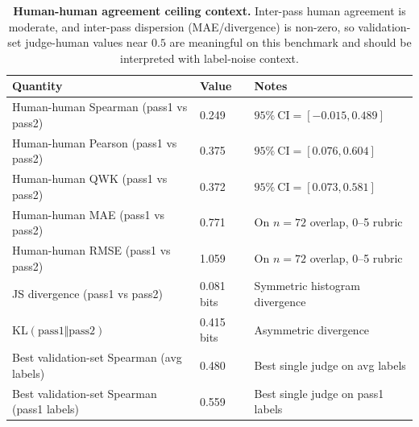\documentclass{article}
\begin{document}
\begin{table}[t]
  \centering
  \small
  \begin{tabular}{@{}p{}p{}p{}@{}}
    \toprule
    \textbf{Quantity}                           & \textbf{Value} & \textbf{Notes}                      \\
    \midrule
    Human-human Spearman (pass1 vs pass2)       & 0.249          & \(95\%\ \text{CI}=[-0.015, 0.489]\) \\
    Human-human Pearson (pass1 vs pass2)        & 0.375          & \(95\%\ \text{CI}=[0.076, 0.604]\)  \\
    Human-human QWK (pass1 vs pass2)            & 0.372          & \(95\%\ \text{CI}=[0.073, 0.581]\)  \\
    Human-human MAE (pass1 vs pass2)            & 0.771          & On \(n=72\) overlap, 0--5 rubric    \\
    Human-human RMSE (pass1 vs pass2)           & 1.059          & On \(n=72\) overlap, 0--5 rubric    \\
    JS divergence (pass1 vs pass2)              & 0.081 bits     & Symmetric histogram divergence      \\
    KL\((\text{pass1}\Vert\text{pass2})\)       & 0.415 bits     & Asymmetric divergence               \\
    Best validation-set Spearman (avg labels)   & 0.480          & Best single judge on avg labels     \\
    Best validation-set Spearman (pass1 labels) & 0.559          & Best single judge on pass1 labels   \\
    \bottomrule
  \end{tabular}
  \caption{\textbf{Human-human agreement ceiling context.}
    Inter-pass human agreement is moderate, and inter-pass dispersion (MAE/divergence) is non-zero, so validation-set judge-human values near \(0.5\) are meaningful on this benchmark and should be interpreted with label-noise context.}
  \label{tab:app-human-human-ceiling}
\end{table}
\end{document}
